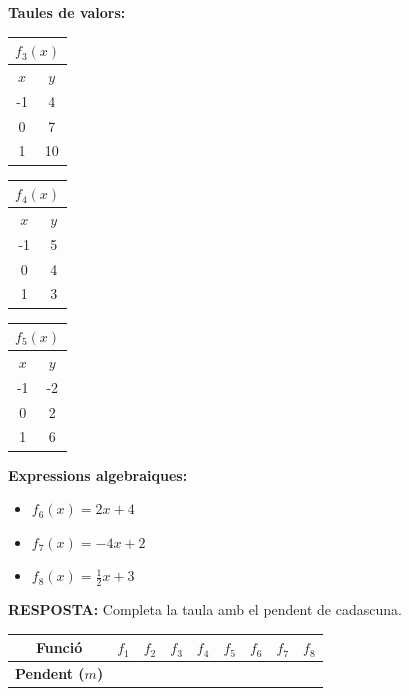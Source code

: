 \documentclass[12pt,a4paper]{article}
\begin{document}
\noindent
\textbf{Taules de valors:}

\vspace{0.2cm}
\begin{center}
\small
\begin{tabular}{|c|c|}
    \hline \multicolumn{2}{|c|}{$f_3(x)$} \\ \hline
    $x$ & $y$ \\ \hline
    -1 & 4 \\ \hline
    0 & 7 \\ \hline
    1 & 10 \\ \hline
\end{tabular}
\hfill
\begin{tabular}{|c|c|}
    \hline \multicolumn{2}{|c|}{$f_4(x)$} \\ \hline
    $x$ & $y$ \\ \hline
    -1 & 5 \\ \hline
    0 & 4 \\ \hline
    1 & 3 \\ \hline
\end{tabular}
\hfill
\begin{tabular}{|c|c|}
    \hline \multicolumn{2}{|c|}{$f_5(x)$} \\ \hline
    $x$ & $y$ \\ \hline
    -1 & -2 \\ \hline
    0 & 2 \\ \hline
    1 & 6 \\ \hline
\end{tabular}
\end{center}

\vspace{0.3cm}

\noindent
\textbf{Expressions algebraiques:}
\begin{itemize}
    \item $f_6(x) = 2x + 4$
    \item $f_7(x) = -4x + 2$
    \item $f_8(x) = \frac{1}{2}x + 3$
\end{itemize}

\vspace{0.5cm}

\textbf{RESPOSTA:} Completa la taula amb el pendent de cadascuna.

\renewcommand{\arraystretch}{1.5}
\begin{center}
\begin{tabularx}{\textwidth}{|c|X|X|X|X|X|X|X|X|}
    \hline
    \textbf{Funció} & $f_1$ & $f_2$ & $f_3$ & $f_4$ & $f_5$ & $f_6$ & $f_7$ & $f_8$ \\ \hline
    \textbf{Pendent ($m$)} & & & & & & & & \\ \hline
\end{tabularx}
\end{center}
\newpage
\end{document}
